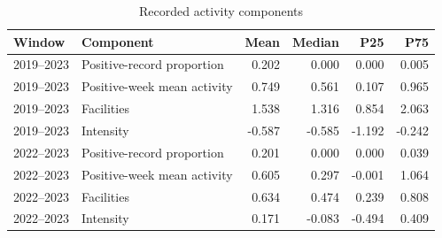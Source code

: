 \begin{table}[htbp]\centering\small
\caption{Recorded activity components}\label{tab:observation}
\begin{tabular}{@{}lp{.34\linewidth}rrrr@{}}
\toprule
Window & Component & Mean & Median & P25 & P75 \\\midrule
2019--2023 & Positive-record proportion & 0.202 & 0.000 & 0.000 & 0.005 \\
2019--2023 & Positive-week mean activity & 0.749 & 0.561 & 0.107 & 0.965 \\
2019--2023 & Facilities & 1.538 & 1.316 & 0.854 & 2.063 \\
2019--2023 & Intensity & -0.587 & -0.585 & -1.192 & -0.242 \\
2022--2023 & Positive-record proportion & 0.201 & 0.000 & 0.000 & 0.039 \\
2022--2023 & Positive-week mean activity & 0.605 & 0.297 & -0.001 & 1.064 \\
2022--2023 & Facilities & 0.634 & 0.474 & 0.239 & 0.808 \\
2022--2023 & Intensity & 0.171 & -0.083 & -0.494 & 0.409 \\
\bottomrule\end{tabular}
\end{table}
